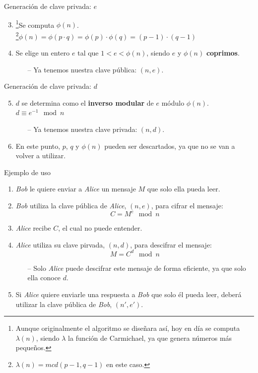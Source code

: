 \documentclass[10pt]{beamer} %
\begin{document}
\begin{frame}{Generación de clave privada: $e$}
\begin{enumerate}
    \setcounter{enumi}{2}
    \item \footnote{Aunque originalmente el algoritmo se diseñara así, hoy en día se computa $\lambda(n)$, siendo $\lambda$ la función de Carmichael, ya que genera números más pequeños.}Se computa $\phi(n)$.\\ \footnote{$\lambda(n) = mcd(p-1, q-1)$ en este caso.}$\phi(n) = \phi(p\cdot q) = \phi(p) \cdot \phi(q) = (p - 1)\cdot(q - 1)$
    \item Se elige un entero $e$ tal que $1 < e < \phi(n)$, siendo $e$ y $\phi(n)$ \textbf{coprimos}.
    \begin{itemize}
        \item[--] Ya tenemos nuestra clave pública: $(n, e)$.
    \end{itemize}
\end{enumerate}
\end{frame}
\begin{frame}{Generación de clave privada: $d$}
\begin{enumerate}
    \setcounter{enumi}{4}
    \item $d$ se determina como el \textbf{inverso modular} de $e$ módulo $\phi(n)$.\\ $d \equiv e^{-1} \mod n$
    \begin{itemize}
        \item[--] Ya tenemos nuestra clave privada: $(n, d)$.
    \end{itemize}
    \item En este punto, $p$, $q$ y $\phi(n)$ pueden ser descartados, ya que no se van a volver a utilizar.
\end{enumerate}
\end{frame}
\begin{frame}{Ejemplo de uso}
    \begin{enumerate}
        \item \textit{Bob} le quiere enviar a \textit{Alice} un mensaje $M$ que solo ella pueda leer.
        \item \textit{Bob} utiliza la clave pública de \textit{Alice}, $(n, e)$, para cifrar el mensaje: \[C = M^e \mod n\]
        \item \textit{Alice} recibe $C$, el cual no puede entender.
        \item \textit{Alice} utiliza su clave pirvada, $(n, d)$, para descifrar el mensaje: \[M = C^d \mod n\]
        \begin{itemize}
            \item[--] Solo \textit{Alice} puede descifrar este mensaje de forma eficiente, ya que solo ella conoce $d$.
        \end{itemize}
        \item Si \textit{Alice} quiere enviarle una respuesta a \textit{Bob} que solo él pueda leer, deberá utilizar la clave pública de \textit{Bob}, $(n', e')$.
    \end{enumerate}
\end{frame}
\end{document}
